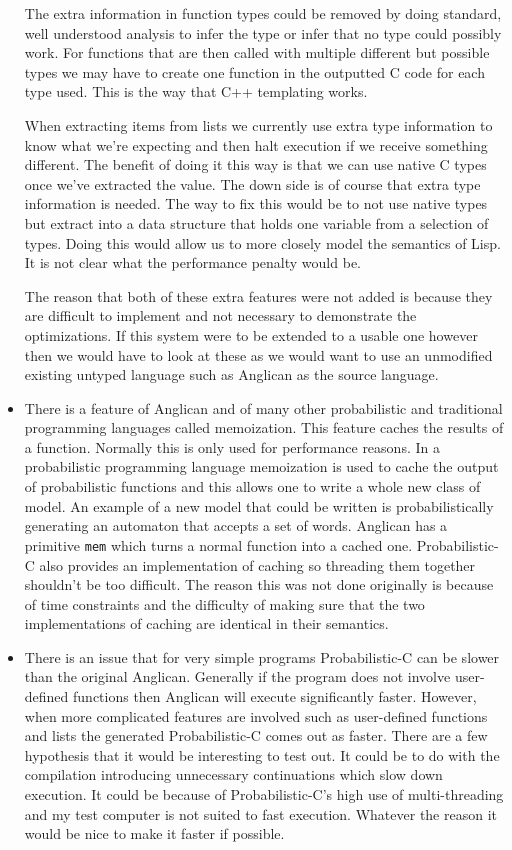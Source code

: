\documentclass[a4paper]{article}
\begin{document}
\begin{itemize}
	The extra information in function types could be removed by doing standard, well understood analysis to infer the type or infer that no type could possibly work. For functions that are then called with multiple different but possible types we may have to create one function in the outputted C code for each type used. This is the way that C++ templating works.

	When extracting items from lists we currently use extra type information to know what we're expecting and then halt execution if we receive something different. The benefit of doing it this way is that we can use native C types once we've extracted the value. The down side is of course that extra type information is needed. The way to fix this would be to not use native types but extract into a data structure that holds one variable from a selection of types. Doing this would allow us to more closely model the semantics of Lisp. It is not clear what the performance penalty would be.

	The reason that both of these extra features were not added is because they are difficult to implement and not necessary to demonstrate the optimizations. If this system were to be extended to a usable one however then we would have to look at these as we would want to use an unmodified existing untyped language such as Anglican as the source language.

\item
	There is a feature of Anglican and of many other probabilistic and traditional programming languages called memoization. This feature caches the results of a function. Normally this is only used for performance reasons. In a probabilistic programming language memoization is used to cache the output of probabilistic functions and this allows one to write a whole new class of model. An example of a new model that could be written is probabilistically generating an automaton that accepts a set of words. Anglican has a primitive \texttt{mem} which turns a normal function into a cached one. Probabilistic-C also provides an implementation of caching so threading them together shouldn't be too difficult. The reason this was not done originally is because of time constraints and the difficulty of making sure that the two implementations of caching are identical in their semantics.

\item
	There is an issue that for very simple programs Probabilistic-C can be slower than the original Anglican. Generally if the program does not involve user-defined functions then Anglican will execute significantly faster. However, when more complicated features are involved such as user-defined functions and lists the generated Probabilistic-C comes out as faster. There are a few hypothesis that it would be interesting to test out. It could be to do with the compilation introducing unnecessary continuations which slow down execution. It could be because of Probabilistic-C's high use of multi-threading and my test computer is not suited to fast execution. Whatever the reason it would be nice to make it faster if possible.

\end{itemize}
\end{document}
